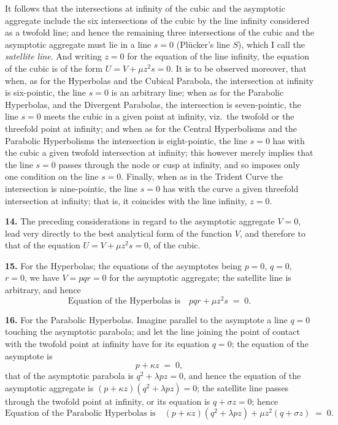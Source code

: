\documentclass[11pt,a4paper]{article}
\begin{document}
It follows that the intersections at infinity of the cubic and the asymptotic aggregate include the six intersections of the cubic by the line infinity considered as a twofold line; and hence the remaining three intersections of the cubic and the asymptotic aggregate must lie in a line $s=0$ (Pl\"ucker's line $S$), which I call the \emph{satellite line}. And writing $z=0$ for the equation of the line infinity, the equation of the cubic is of the form $U = V + \mu z^{2} s = 0$. It is to be observed moreover, that when, as for the Hyperbolas and the Cubical Parabola, the intersection at infinity is six-pointic, the line $s=0$ is an arbitrary line; when as for the Parabolic Hyperbolas, and the Divergent Parabolas, the intersection is seven-pointic, the line $s=0$ meets the cubic in a given point at infinity, viz.\ the twofold or the threefold point at infinity; and when as for the Central Hyperbolisms and the Parabolic Hyperbolisms the intersection is eight-pointic, the line $s=0$ has with the cubic a given twofold intersection at infinity; this however merely implies that the line $s=0$ passes through the node or cusp at infinity, and so imposes only one condition on the line $s=0$. Finally, when as in the Trident Curve the intersection is nine-pointic, the line $s=0$ has with the curve a given threefold intersection at infinity; that is, it coincides with the line infinity, $z=0$.

\medskip

\textbf{14.} The preceding considerations in regard to the asymptotic aggregate $V=0$, lead very directly to the best analytical form of the function $V$, and therefore to that of the equation $U = V + \mu z^{2} s = 0$, of the cubic.

\medskip

\textbf{15.} For the Hyperbolas; the equations of the asymptotes being $p=0$, $q=0$, $r=0$, we have $V = pqr = 0$ for the asymptotic aggregate; the satellite line is arbitrary, and hence
\[
\text{Equation of the Hyperbolas is}\quad pqr + \mu z^{2}s \;=\; 0.
\]

\medskip

\textbf{16.} For the Parabolic Hyperbolas. Imagine parallel to the asymptote a line $q=0$ touching the asymptotic parabola; and let the line joining the point of contact with the twofold point at infinity have for its equation $q=0$; the equation of the asymptote is
\[
p + \kappa z \;=\; 0,
\]
that of the asymptotic parabola is $q^{2}+\lambda p z = 0$, and hence the equation of the asymptotic aggregate is $(p+\kappa z)(q^{2}+\lambda p z) = 0$; the satellite line passes through the twofold point at infinity, or its equation is $q + \sigma z = 0$; hence
\[
\text{Equation of the Parabolic Hyperbolas is}\quad (p+\kappa z)(q^{2}+\lambda p z) + \mu z^{2}(q + \sigma z) \;=\; 0.
\]
\end{document}
